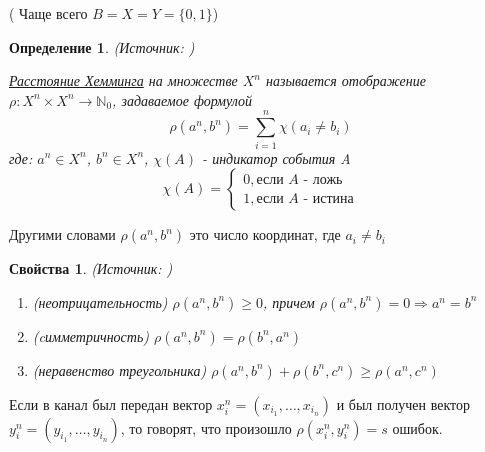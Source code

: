 \documentclass[14pt,a4paper,russian]{article}
\newtheorem{opr}{Определение}[section]
\newtheorem{svva}{Свойства}[opr]
\newcommand{\N}{\mathbb{N}}
\begin{document}
( Чаще всего  $B = X = Y = \{0, 1\}$)
\begin{opr}
	(Источник: \cite{Checheta})
	
	\uline{Расстояние Хемминга} на множестве $X^n$ называется отображение $\rho \colon X^n \times X^n \rightarrow \N_0$, задаваемое формулой
	 \begin{equation}
	 	\rho(a^n, b^n) = \sum_{i = 1}^{n} \chi(a_i \ne b_i)
	 \end{equation}
	 где: $a^n \in X^n$, $b^n \in X^n$, $\chi(A)$ - индикатор события A
	 $$\chi(A) = \begin{cases}
	 0, \text{если $A$ - ложь}\\
	 1, \text{если $A$ - истина}
	 \end{cases}$$
\end{opr}
Другими словами $\rho(a^n, b^n)$ это число координат, где $a_i \ne b_i$
\begin{svva} 
	(Источник: \cite{Checheta})
	
	\begin{enumerate}
		\item (неотрицательность) $\rho(a^n, b^n) \ge 0$, причем $\rho(a^n, b^n) = 0 \Rightarrow a^n = b^n$
		\item (cимметричность) $\rho(a^n, b^n) = \rho(b^n, a^n)$
		\item (неравенство треугольника) $\rho(a^n, b^n) + \rho(b^n, c^n) \ge \rho(a^n, c^n)$
	\end{enumerate}
\end{svva}

Если в канал был передан вектор $x_i^n = (x_{i_1}, \ldots, x_{i_n})$ и был получен вектор $y_i^n = (y_{i_1}, \ldots, y_{i_n})$, то говорят, что произошло $\rho(x_i^n, y_i^n) = s$ ошибок.
\newpage

\printbibliography[title={Список использованных источников}]
\end{document}

